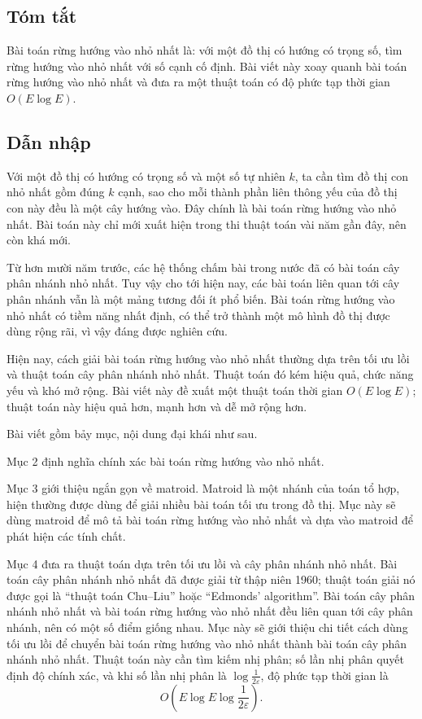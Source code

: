 \documentclass[11pt]{article}
\begin{document}
\subsection*{Tóm tắt}

Bài toán rừng hướng vào nhỏ nhất là: với một đồ thị có hướng có trọng số, tìm
rừng hướng vào nhỏ nhất với số cạnh cố định. Bài viết này xoay quanh bài toán
rừng hướng vào nhỏ nhất và đưa ra một thuật toán có độ phức tạp thời gian
\(O(E\log E)\).

\subsection{Dẫn nhập}

Với một đồ thị có hướng có trọng số và một số tự nhiên \(k\), ta cần tìm đồ thị
con nhỏ nhất gồm đúng \(k\) cạnh, sao cho mỗi thành phần liên thông yếu của đồ
thị con này đều là một cây hướng vào. Đây chính là bài toán rừng hướng vào nhỏ
nhất. Bài toán này chỉ mới xuất hiện trong thi thuật toán vài năm gần đây, nên
còn khá mới.

Từ hơn mười năm trước, các hệ thống chấm bài trong nước đã có bài toán cây phân
nhánh nhỏ nhất. Tuy vậy cho tới hiện nay, các bài toán liên quan tới cây phân
nhánh vẫn là một mảng tương đối ít phổ biến. Bài toán rừng hướng vào nhỏ nhất
có tiềm năng nhất định, có thể trở thành một mô hình đồ thị được dùng rộng rãi,
vì vậy đáng được nghiên cứu.

Hiện nay, cách giải bài toán rừng hướng vào nhỏ nhất thường dựa trên tối ưu lồi
và thuật toán cây phân nhánh nhỏ nhất. Thuật toán đó kém hiệu quả, chức năng yếu
và khó mở rộng. Bài viết này đề xuất một thuật toán thời gian \(O(E\log E)\);
thuật toán này hiệu quả hơn, mạnh hơn và dễ mở rộng hơn.

Bài viết gồm bảy mục, nội dung đại khái như sau.

Mục 2 định nghĩa chính xác bài toán rừng hướng vào nhỏ nhất.

Mục 3 giới thiệu ngắn gọn về matroid. Matroid là một nhánh của toán tổ hợp, hiện
thường được dùng để giải nhiều bài toán tối ưu trong đồ thị. Mục này sẽ dùng
matroid để mô tả bài toán rừng hướng vào nhỏ nhất và dựa vào matroid để phát
hiện các tính chất.

Mục 4 đưa ra thuật toán dựa trên tối ưu lồi và cây phân nhánh nhỏ nhất. Bài toán
cây phân nhánh nhỏ nhất đã được giải từ thập niên 1960; thuật toán giải nó được
gọi là ``thuật toán Chu--Liu'' hoặc ``Edmonds' algorithm''. Bài toán cây phân
nhánh nhỏ nhất và bài toán rừng hướng vào nhỏ nhất đều liên quan tới cây phân
nhánh, nên có một số điểm giống nhau. Mục này sẽ giới thiệu chi tiết cách dùng
tối ưu lồi để chuyển bài toán rừng hướng vào nhỏ nhất thành bài toán cây phân
nhánh nhỏ nhất. Thuật toán này cần tìm kiếm nhị phân; số lần nhị phân quyết định
độ chính xác, và khi số lần nhị phân là \(\log\frac{1}{2\varepsilon}\), độ phức
tạp thời gian là
\[
O\left(E\log E\log\frac{1}{2\varepsilon}\right).
\]
\end{document}
